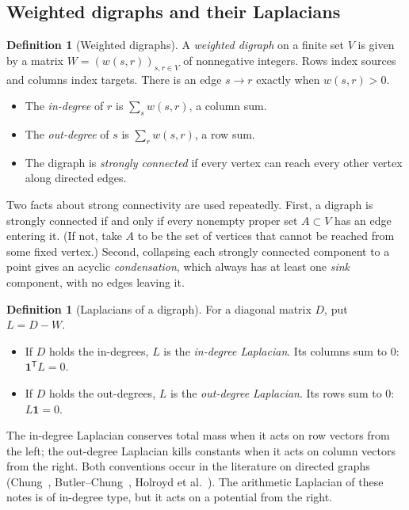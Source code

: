 \documentclass[11pt]{article}
\theoremstyle{definition}
\newtheorem{definition}[theorem]{Definition}
\theoremstyle{remark}
\newcommand{\one}{\mathbf{1}}
\begin{document}
\subsection{Weighted digraphs and their Laplacians}\label{sec:digraphs}

\begin{definition}[Weighted digraphs]
A \emph{weighted digraph} on a finite set $V$ is given by a matrix
$W=(w(s,r))_{s,r\in V}$ of nonnegative integers.  Rows index sources and
columns index targets.  There is an edge $s\to r$ exactly when $w(s,r)>0$.
\begin{itemize}[leftmargin=1.5em]
\item The \emph{in-degree} of $r$ is $\sum_s w(s,r)$, a column sum.
\item The \emph{out-degree} of $s$ is $\sum_r w(s,r)$, a row sum.
\item The digraph is \emph{strongly connected} if every vertex can reach
  every other vertex along directed edges.
\end{itemize}
\end{definition}

Two facts about strong connectivity are used repeatedly.  First, a digraph
is strongly connected if and only if every nonempty proper set $A\subset V$
has an edge entering it.  (If not, take $A$ to be the set of vertices that
cannot be reached from some fixed vertex.)  Second, collapsing each strongly
connected component to a point gives an acyclic \emph{condensation}, which
always has at least one \emph{sink} component, with no edges leaving it.

\begin{definition}[Laplacians of a digraph]
For a diagonal matrix $D$, put $L=D-W$.
\begin{itemize}[leftmargin=1.5em]
\item If $D$ holds the in-degrees, $L$ is the \emph{in-degree Laplacian}.
  Its columns sum to $0$: $\one^{\mathsf T}L=0$.
\item If $D$ holds the out-degrees, $L$ is the \emph{out-degree Laplacian}.
  Its rows sum to $0$: $L\one=0$.
\end{itemize}
\end{definition}

The in-degree Laplacian conserves total mass when it acts on row vectors from
the left; the out-degree Laplacian kills constants when it acts on column
vectors from the right.  Both conventions occur in the literature on
directed graphs (Chung~\cite{Chung2005}, Butler--Chung~\cite{ButlerChung},
Holroyd et al.~\cite{HLMPPW}).  The arithmetic Laplacian of these notes is of
in-degree type, but it acts on a potential from the right.
\end{document}
